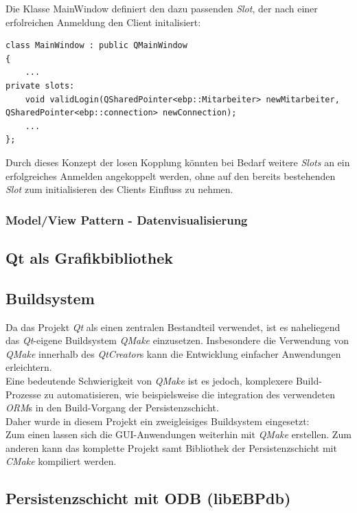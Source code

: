 Die Klasse MainWindow definiert den dazu passenden \textit{Slot}, der nach einer erfolreichen Anmeldung den Client initalisiert:
\begin{lstlisting}
class MainWindow : public QMainWindow
{
    ...
private slots:
    void validLogin(QSharedPointer<ebp::Mitarbeiter> newMitarbeiter, QSharedPointer<ebp::connection> newConnection);
    ...
};
\end{lstlisting}
Durch dieses Konzept der losen Kopplung könnten bei Bedarf weitere \textit{Slots} an ein erfolgreiches Anmelden angekoppelt werden, ohne auf den bereits bestehenden \textit{Slot} zum initialisieren des Clients Einfluss zu nehmen.
\subsubsection{Model/View Pattern - Datenvisualisierung}

\subsection{Qt als Grafikbibliothek}

\newpage

\subsection{Buildsystem}
Da das Projekt \textit{Qt} als einen zentralen Bestandteil verwendet, ist es naheliegend das \textit{Qt}-eigene Buildsystem \textit{QMake} einzusetzen. Insbesondere die Verwendung von \textit{QMake} innerhalb des \textit{QtCreator}s kann die Entwicklung einfacher Anwendungen erleichtern.\\
Eine bedeutende Schwierigkeit von \textit{QMake} ist es jedoch, komplexere Build-Prozesse zu automatisieren, wie beispielsweise die integration des verwendeten \textit{ORM}s in den Build-Vorgang der Persistenzschicht.\\
Daher wurde in diesem Projekt ein zweigleisiges Buildsystem eingesetzt:\\
Zum einen lassen sich die GUI-Anwendungen weiterhin mit \textit{QMake} erstellen. Zum anderen kann das komplette Projekt samt Bibliothek der Persistenzschicht mit \textit{CMake} kompiliert werden.\\

\newpage

\subsection{Persistenzschicht mit ODB (libEBPdb)}

